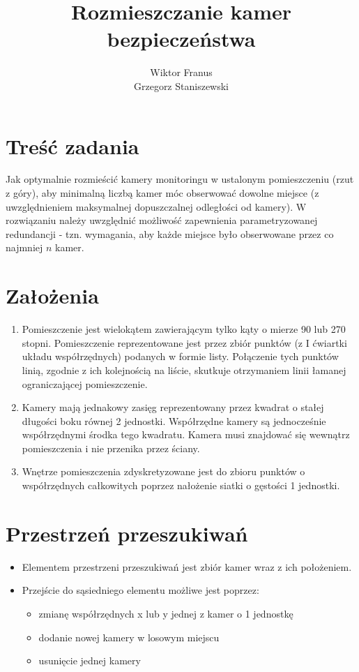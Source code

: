 \documentclass[12pt,a4paper]{article}
\title{Rozmieszczanie kamer bezpieczeństwa}
\author{Wiktor Franus \\ Grzegorz Staniszewski}
\begin{document}
\maketitle
\tableofcontents

\newpage
\section{Treść zadania}
Jak optymalnie rozmieścić kamery monitoringu w ustalonym pomieszczeniu (rzut z góry), aby minimalną liczbą kamer móc obserwować dowolne miejsce (z uwzględnieniem maksymalnej dopuszczalnej odległości od kamery). W rozwiązaniu należy uwzględnić możliwość zapewnienia parametryzowanej redundancji - tzn. wymagania, aby każde miejsce było obserwowane przez co najmniej $n$ kamer.

\section{Założenia}
\begin{enumerate}

\item Pomieszczenie jest wielokątem zawierającym tylko kąty o mierze 90 lub 270 stopni. Pomieszczenie reprezentowane jest przez zbiór punktów (z I ćwiartki układu współrzędnych) podanych w formie listy. Połączenie tych punktów linią, zgodnie z ich kolejnością na liście, skutkuje otrzymaniem linii łamanej ograniczającej pomieszczenie.
\item Kamery mają jednakowy zasięg reprezentowany przez kwadrat o stałej długości boku równej 2 jednostki. Współrzędne kamery są jednocześnie współrzędnymi środka tego kwadratu. Kamera musi znajdować się wewnątrz pomieszczenia i nie przenika przez ściany.
\item Wnętrze pomieszczenia zdyskretyzowane jest do zbioru punktów o współrzędnych całkowitych poprzez nałożenie siatki o gęstości 1 jednostki.
\end{enumerate}

\section{Przestrzeń przeszukiwań}
\begin{itemize}
	\item Elementem przestrzeni przeszukiwań jest zbiór kamer wraz z ich położeniem.
	\item Przejście do sąsiedniego elementu możliwe jest poprzez:
	\begin{itemize}
		\item zmianę współrzędnych x lub y jednej z kamer o 1 jednostkę
		\item dodanie nowej kamery w losowym miejscu
		\item usunięcie jednej kamery
	\end{itemize}
\end{itemize}
\end{document}
